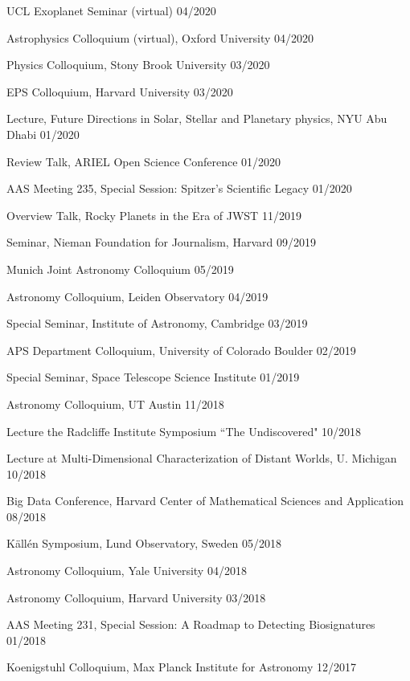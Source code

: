 \documentclass[12pt,letterpaper]{article}
\begin{document}
\begin{list}{}{\cvlist}
\item {UCL Exoplanet Seminar (virtual) \hfill 04/2020}
\item {Astrophysics Colloquium (virtual), Oxford University \hfill 04/2020}
\item {Physics Colloquium, Stony Brook University \hfill 03/2020}
\item {EPS Colloquium, Harvard University \hfill 03/2020}
\item {Lecture, Future Directions in Solar, Stellar and Planetary physics, NYU Abu Dhabi \hfill 01/2020}
\item {Review Talk, ARIEL Open Science Conference \hfill 01/2020} 
\item {AAS Meeting 235, Special Session: Spitzer's Scientific Legacy \hfill 01/2020}
\item {Overview Talk, Rocky Planets in the Era of JWST \hfill 11/2019}
\item {Seminar, Nieman Foundation for Journalism, Harvard \hfill 09/2019}
\item {Munich Joint Astronomy Colloquium \hfill 05/2019}
\item {Astronomy Colloquium, Leiden Observatory \hfill 04/2019}
\item {Special Seminar, Institute of Astronomy, Cambridge \hfill 03/2019}
\item {APS Department Colloquium, University of Colorado Boulder \hfill 02/2019}
\item {Special Seminar, Space Telescope Science Institute \hfill 01/2019}
\item {Astronomy Colloquium, UT Austin \hfill 11/2018}
\item {Lecture the Radcliffe Institute Symposium ``The Undiscovered" \hfill 10/2018}
\item {Lecture at Multi-Dimensional Characterization of Distant Worlds, U. Michigan \hfill 10/2018}
\item {Big Data Conference, Harvard Center of Mathematical Sciences and Application \hfill 08/2018}
\item {K\"{a}ll\'{e}n Symposium, Lund Observatory, Sweden \hfill 05/2018}
\item {Astronomy Colloquium, Yale University \hfill 04/2018}
\item{Astronomy Colloquium, Harvard University \hfill 03/2018}
\item {AAS Meeting 231, Special Session: A Roadmap to Detecting Biosignatures \hfill 01/2018}
\item {Koenigstuhl Colloquium, Max Planck Institute for Astronomy \hfill 12/2017}

\end{list}
\end{document}
